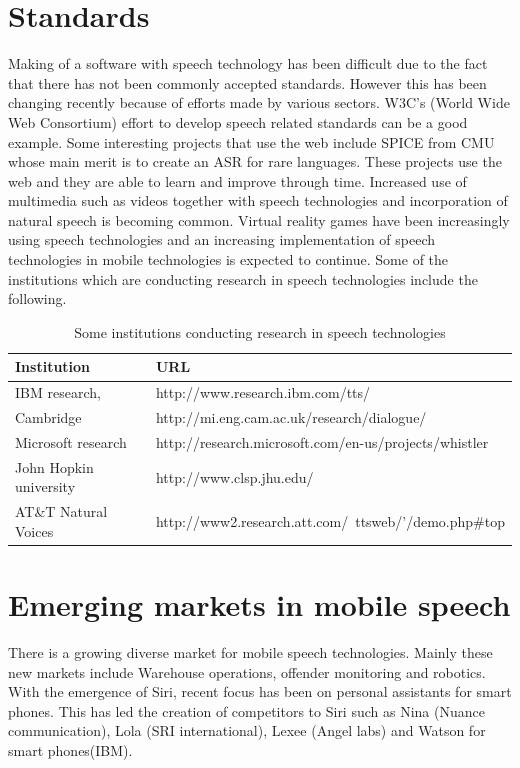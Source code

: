 \documentclass[11pt,a4paper,oneside,article]{memoir}
\begin{document}
\section{Standards}
Making of a software with speech technology has been difficult due to the fact that there has not been commonly accepted standards. However this has been changing recently because of efforts made by various sectors. W3C's (World Wide Web Consortium) effort to develop speech related standards can be a good example. Some interesting projects that use the web include SPICE from CMU whose main merit is to create an ASR for rare languages. These projects use the web and they are able to learn and improve through time. Increased use of multimedia such as videos together with speech technologies and incorporation of natural speech is becoming common. Virtual reality games have been increasingly using speech technologies and an increasing implementation of speech technologies in mobile technologies is expected to continue. Some of the institutions which are conducting research in speech technologies include the following.\\
\begin{table}[h]
 \caption{Some institutions conducting research in speech technologies}
    \begin{tabular}{ | l | l | }
    \hline
    \textbf{Institution} & \textbf{URL} \\ \hline
    IBM research, & http://www.research.ibm.com/tts/ \\ \hline
    Cambridge &  http://mi.eng.cam.ac.uk/research/dialogue/   \\ \hline
    Microsoft research &  http://research.microsoft.com/en-us/projects/whistler \\ \hline
    John Hopkin university &  http://www.clsp.jhu.edu/   \\ \hline
    AT\&T Natural Voices & http://www2.research.att.com/~ttsweb/'/demo.php\#top  \\ \hline
    \end{tabular}
\end{table}

\section{Emerging markets in mobile speech}
There is a growing diverse market for mobile speech technologies. Mainly these new markets include Warehouse operations, offender monitoring and robotics. With the emergence of Siri, recent focus has been on personal assistants for smart phones. This has led the creation of competitors to Siri such as Nina (Nuance communication), Lola (SRI international), Lexee (Angel labs) and Watson for smart phones(IBM). \cite{markowitz}
\end{document}
